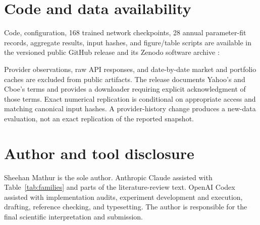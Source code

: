 \section*{Code and data availability}
Code, configuration, 168 trained network checkpoints, 28 annual parameter-fit records, aggregate results, input hashes, and figure/table scripts are available in the versioned public GitHub release and its Zenodo software archive \cite{repository,softwarearchive}:\par
{}\par
{}\par
Provider observations, raw API responses, and date-by-date market and portfolio caches are excluded from public artifacts. The release documents Yahoo's and Cboe's terms and provides a downloader requiring explicit acknowledgment of those terms. Exact numerical replication is conditional on appropriate access and matching canonical input hashes. A provider-history change produces a new-data evaluation, not an exact replication of the reported snapshot.

\section*{Author and tool disclosure}
Sheehan Mathur is the sole author. Anthropic Claude assisted with Table~\ref{tab:families} and parts of the literature-review text. OpenAI Codex assisted with implementation audits, experiment development and execution, drafting, reference checking, and typesetting. The author is responsible for the final scientific interpretation and submission.
